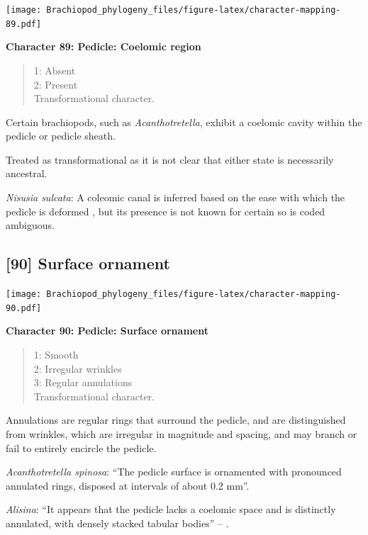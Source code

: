 \documentclass[openany]{book}
\theoremstyle{definition}
\theoremstyle{definition}
\theoremstyle{definition}
\theoremstyle{remark}
\begin{document}
\texttt{[image: Brachiopod\_phylogeny\_files/figure-latex/character-mapping-89.pdf]}

\textbf{Character 89: Pedicle: Coelomic region}

\begin{quote}
1: Absent\\
2: Present\\
Transformational character.
\end{quote}

Certain brachiopods, such as \emph{Acanthotretella}, exhibit a coelomic
cavity within the pedicle or pedicle sheath.

Treated as transformational as it is not clear that either state is
necessarily ancestral.

\hypertarget{Nisusia_sulcata-coding-89}{}
\emph{Nisusia sulcata}: A coleomic canal is inferred based on the ease
with which the pedicle is deformed
\citep{Holmer2018Evolutionarysignificance}, but its presence is not
known for certain so is coded ambiguous.

\subsection*{{[}90{]} Surface ornament}\label{surface-ornament-1}

\texttt{[image: Brachiopod\_phylogeny\_files/figure-latex/character-mapping-90.pdf]}

\textbf{Character 90: Pedicle: Surface ornament}

\begin{quote}
1: Smooth\\
2: Irregular wrinkles\\
3: Regular annulations\\
Transformational character.
\end{quote}

Annulations are regular rings that surround the pedicle, and are
distinguished from wrinkles, which are irregular in magnitude and
spacing, and may branch or fail to entirely encircle the pedicle.

\hypertarget{Acanthotretella_spinosa-coding-90}{}
\emph{Acanthotretella spinosa}: ``The pedicle surface is ornamented with
pronounced annulated rings, disposed at intervals of about 0.2 mm''.

\hypertarget{Alisina-coding-90}{}
\emph{Alisina}: ``It appears that the pedicle lacks a coelomic space and
is distinctly annulated, with densely stacked tabular bodies'' --
\citet{Zhang2011Anobolellate}.
\end{document}
